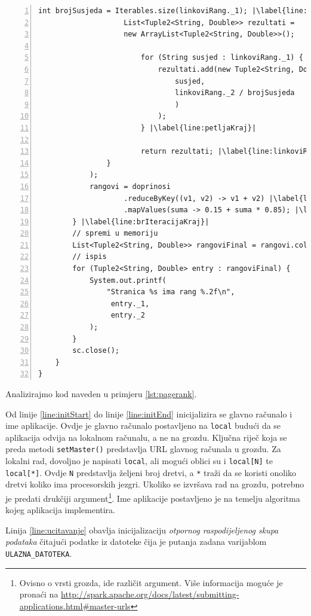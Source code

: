 \documentclass[times, utf8, zavrsni, numeric]{fer}
\begin{document}
\begin{lstlisting}[numbers=left, label={lst:pagerank}, caption={Algoritam \emph{PageRank}.}, escapechar=|]
					int brojSusjeda = Iterables.size(linkoviRang._1); |\label{line:brojSusjeda}|
					List<Tuple2<String, Double>> rezultati = 
					new ArrayList<Tuple2<String, Double>>();
					
						for (String susjed : linkoviRang._1) { |\label{line:petljaStart}|
							rezultati.add(new Tuple2<String, Double>(
								susjed,
								linkoviRang._2 / brojSusjeda
								)
							);
						} |\label{line:petljaKraj}|
						
						return rezultati; |\label{line:linkoviRangKraj}|					
				}
			);
			rangovi = doprinosi
					.reduceByKey((v1, v2) -> v1 + v2) |\label{line:zbrojPoKljucu}|
					.mapValues(suma -> 0.15 + suma * 0.85); |\label{line:postaviRang}|
		} |\label{line:brIteracijaKraj}|
		// spremi u memoriju
		List<Tuple2<String, Double>> rangoviFinal = rangovi.collect(); |\label{line:spremanjePodataka}|
		// ispis
		for (Tuple2<String, Double> entry : rangoviFinal) {
			System.out.printf(
				"Stranica %s ima rang %.2f\n",
				 entry._1,
				 entry._2
			);
		}
		sc.close();
	}
}
\end{lstlisting}
\vspace{5mm}

Analizirajmo kod naveden u primjeru \ref{lst:pagerank}. 

Od linije \ref{line:initStart} do linije \ref{line:initEnd} inicijalizira se glavno računalo i ime aplikacije. Ovdje je glavno računalo postavljeno na \texttt{local} budući da se aplikacija odvija na lokalnom računalu, a ne na grozdu. Ključna riječ koja se preda metodi \texttt{setMaster()} predstavlja URL glavnog računala u grozdu. Za lokalni rad, dovoljno je napisati \texttt{local}, ali mogući oblici su i \texttt{local[N]} te \texttt{local[*]}. Ovdje \texttt{N} predstavlja željeni broj dretvi, a \texttt{*} traži da se koristi onoliko dretvi koliko ima procesorskih jezgri. Ukoliko se izvršava rad na grozdu, potrebno je predati drukčiji argument\footnote{Ovisno o vrsti grozda, ide različit argument. Više informacija moguće je pronaći na \url{http://spark.apache.org/docs/latest/submitting-applications.html#master-urls}}. Ime aplikacije postavljeno je na temelju algoritma kojeg aplikacija implementira.

Linija \ref{line:ucitavanje} obavlja inicijalizaciju \emph{otpornog raspodijeljenog skupa podataka} čitajući podatke iz datoteke čija je putanja zadana varijablom \texttt{ULAZNA\_DATOTEKA}.
\end{document}
